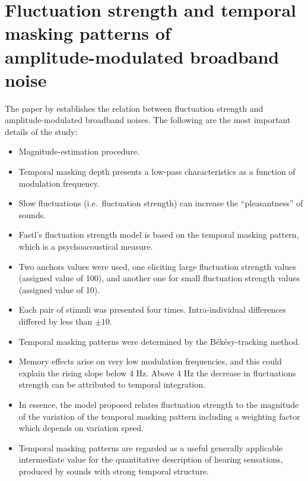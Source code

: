 \section{Fluctuation strength and temporal masking patterns of
\texorpdfstring{\\}{} amplitude-modulated broadband noise}

The paper by \citeauthor{Fastl1982Fluctuation} establishes the relation between
fluctuation strength and amplitude-modulated broadband noises. The following
are the most important details of the study:

\begin{itemize}
    \item Magnitude-estimation procedure.
    \item Temporal masking depth presents a low-pass characteristics as a
        function of modulation frequency.
    \item Slow fluctuations (i.e.\ fluctuation strength) can increase the
        ``pleasantness'' of sounds.
    \item Fastl's fluctuation strength model is based on the temporal masking
        pattern, which is a psychoacoustical measure.
    \item  Two anchors values were used, one eliciting large fluctuation
        strength values (assigned value of 100), and another one for small
        fluctuation strength values (assigned value of 10).
    \item Each pair of stimuli was presented four times. Intra-individual
        differences differed by less than $\pm 10$.
    \item Temporal masking patterns were determined by the Békésy-tracking
        method.
    \item Memory effects arise on very low modulation frequencies, and this
        could explain the rising slope below 4 Hz. Above 4 Hz the decrease in
        fluctuations strength can be attributed to temporal integration.
    \item In essence, the model proposed relates fluctuation strength to the
        magnitude of the variation of the temporal masking pattern including a
        weighting factor which depends on variation speed.
    \item Temporal masking patterns are regarded as a useful generally
        applicable intermediate value for the quantitative description of
        hearing sensations, produced by sounds with strong temporal structure.
\end{itemize}
